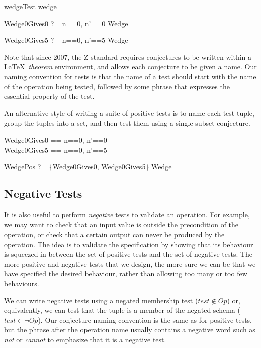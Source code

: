 \documentclass{llncs}
\begin{document}
\begin{zsection}
  \SECTION wedgeTest \parents wedge
\end{zsection}

\begin{theorem}{Wedge0Gives0}
  \vdash? ~ \lblot n==0, n'==0 \rblot \in Wedge
\end{theorem}
\vspace{-5ex}
\begin{theorem}{Wedge0Gives5}
  \vdash? ~ \lblot n==0, n'==5 \rblot \in Wedge
\end{theorem}

Note that since 2007, the Z standard requires conjectures
to be written within a \LaTeX\ \emph{theorem} environment, and allows
each conjecture to be given a name.  Our naming convention for tests
is that the name of a test should start with the name of the operation
being tested, followed by some phrase that expresses the essential
property of the test.

An alternative style of writing a suite of positive tests is to 
name each test tuple, group the tuples into a set, and then test
them using a single subset conjecture.

\begin{zed}
  Wedge0Gives0 == \lblot n==0, n'==0 \rblot \\
  Wedge0Gives5 == \lblot n==0, n'==5 \rblot
\end{zed}

\begin{theorem}{WedgePos}
  \vdash? ~ \{Wedge0Gives0, Wedge0Gives5\} \subseteq Wedge
\end{theorem}


\subsection{Negative Tests}

It is also useful to perform \emph{negative} tests to validate an
operation.  For example, we may want to check that an input value is
outside the precondition of the operation, or check that a certain output
can never be produced by the operation.  The idea is to validate the
specification by showing that its behaviour is squeezed in between the set
of positive tests and the set of negative tests.  The more positive and
negative tests that we design, the more sure we can be that we have
specified the desired behaviour, rather than allowing too many or too few
behaviours.

We can write negative tests using a negated membership test ($test
\notin Op$) or, equivalently, we can test that the tuple is a member
of the negated schema ($test \in \lnot Op$).  Our conjecture naming
convention is the same as for positive tests, but the phrase after the
operation name usually contains a negative word such as \emph{not} or
\emph{cannot} to emphasize that it is a negative test.
\end{document}
